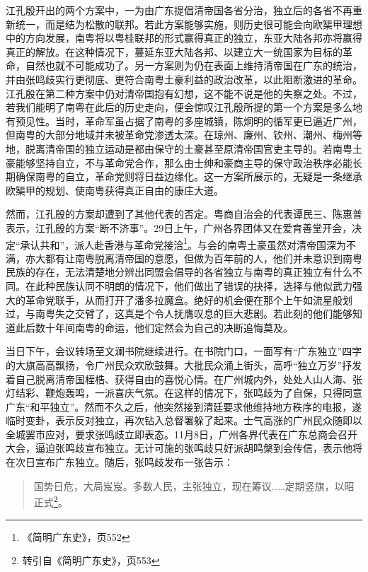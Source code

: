 江孔殷开出的两个方案中，一为由广东提倡清帝国各省分治，独立后的各省不再重新统一，而是结为松散的联邦。若此方案能够实施，则历史很可能会向欧榘甲理想中的方向发展，南粤将以粤桂联邦的形式赢得真正的独立，东亚大陆各邦亦将赢得真正的解放。在这种情况下，蔓延东亚大陆各邦、以建立大一统国家为目标的革命，自然也就不可能成功了。另一方案则为仍在表面上维持清帝国在广东的统治，并由张鸣歧实行更彻底、更符合南粤土豪利益的政治改革，以此阻断激进的革命。江孔殷在第二种方案中仍对清帝国抱有幻想，这不能不说是他的失察之处。不过，若我们能明了南粤在此后的历史走向，便会惊叹江孔殷所提的第一个方案是多么地有预见性。当时，革命军虽占据了南粤的多座城镇，陈炯明的循军更已逼近广州，但南粤的大部分地域并未被革命党渗透太深。在琼州、廉州、钦州、潮州、梅州等地，脱离清帝国的独立运动是都由保守的土豪甚至原清帝国官吏主导的。若南粤土豪能够坚持自立，不与革命党合作，那么由士绅和豪商主导的保守政治秩序必能长期确保南粤的自立，革命党则将日益边缘化。这一方案所展示的，无疑是一条继承欧榘甲的规划、使南粤获得真正自由的康庄大道。

然而，江孔殷的方案却遭到了其他代表的否定。粤商自治会的代表谭民三、陈惠普表示，江孔殷的方案“断不济事”。29日上午，广州各界团体又在爱育善堂开会，决定“承认共和”，派人赴香港与革命党接洽\footnote{《简明广东史》，页552}。与会的南粤土豪虽然对清帝国深为不满，亦大都有让南粤脱离清帝国的意愿，但做为百年前的人，他们并未意识到南粤民族的存在，无法清楚地分辨出同盟会倡导的各省独立与南粤的真正独立有什么不同。在此种民族认同不明朗的情况下，他们做出了错误的抉择，选择与他似武力强大的革命党联手，从而打开了潘多拉魔盒。绝好的机会便在那个上午如流星般划过，与南粤失之交臂了，这真是个令人抚膺叹息的巨大悲剧。若此刻的他们能够知道此后数十年间南粤的命运，他们定然会为自己的决断追悔莫及。

当日下午，会议转场至文澜书院继续进行。在书院门口，一面写有“广东独立”四字的大旗高高飘扬，令广州民众欢欣鼓舞。大批民众涌上街头，高呼“独立万岁”抒发着自己脱离清帝国桎梏、获得自由的喜悦心情。在广州城内外，处处人山人海、张灯结彩、鞭炮轰鸣，一派喜庆气氛。在这样的情况下，张鸣歧为了自保，只得同意广东“和平独立”。然而不久之后，他突然接到清廷要求他维持地方秩序的电报，遂临时变卦，表示反对独立，再次钻入总督署躲了起来。士气高涨的广州民众随即以全城罢市应对，要求张鸣歧立即表态。11月8日，广州各界代表在广东总商会召开大会，逼迫张鸣歧宣布独立。无计可施的张鸣歧只好派胡鸣槃到会传信，表示他将在次日宣布广东独立。随后，张鸣歧发布一张告示：

\begin{quote}

国势日危，大局岌岌。多数人民，主张独立，现在筹议……定期竖旗，以昭正式\footnote{转引自《简明广东史》，页553}。

\end{quote}


